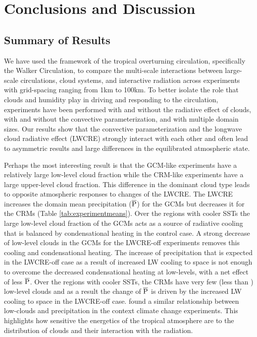\documentclass[draft]{agujournal2019}
\begin{document}
{\section{Conclusions and Discussion} 


\subsection{Summary of Results}

We have used the framework of the tropical overturning circulation, specifically the Walker Circulation, 
to compare the multi-scale interactions between large-scale circulations, cloud systems, and interactive 
radiation across experiments with grid-spacing ranging from 1km to 100km.   
To better isolate the role that clouds and humidity play in driving and responding to the 
circulation, experiments have been performed with and without the radiative effect of clouds, with and without the 
convective parameterization, and with multiple domain sizes.  Our results show that 
the convective parameterization and the longwave cloud radiative effect (LWCRE) strongly interact with each other and 
often lead to asymmetric results and large differences in the equilibrated atmospheric state.  

Perhaps the most interesting result is that the GCM-like experiments have a relatively large low-level 
cloud fraction while the CRM-like experiments have a large upper-level cloud fraction.  
This difference in the dominant cloud type leads to opposite atmospheric responses to changes of the LWCRE.  
The LWCRE increases the domain mean precipitation ($\overline{\rm{P}}$) for the GCMs but 
decreases it for the CRMs (Table \ref{tab:experimentmeans}).  
Over the regions with cooler SSTs the large low-level cloud fraction of the GCMs 
acts as a source of radiative cooling that is balanced by condensational heating in the control case.  
A strong decrease of low-level clouds in the GCMs
for the LWCRE-off experiments removes this cooling and condensational heating.  The increase 
of precipitation that is expected in the LWCRE-off case as a result of increased LW cooling to space is not enough
to overcome the decreased condensational heating at low-levels, with a net effect of less $\overline{\rm{P}}$.  
Over the regions with cooler SSTs, the CRMs have very few (less than ) low-level clouds and as a result the 
change of $\overline{\rm{P}}$ is driven by the increased LW cooling to space in the LWCRE-off case.
 found a similar relationship between low-clouds and precipitation in the context  climate 
change experiments.  This highlights how sensitive the energetics of the tropical atmosphere are to the distribution of clouds and 
their interaction with the radiation.      

}
\end{document}
